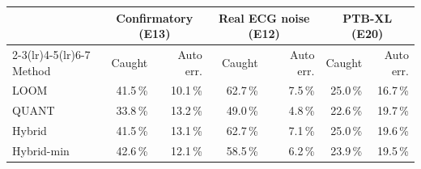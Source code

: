 \begin{tabular}{lrrrrrr}
\toprule
& \multicolumn{2}{c}{Confirmatory (E13)} & \multicolumn{2}{c}{Real ECG noise (E12)} & \multicolumn{2}{c}{PTB-XL (E20)} \\ \cmidrule(lr){2-3}\cmidrule(lr){4-5}\cmidrule(lr){6-7}
Method & Caught & Auto err. & Caught & Auto err. & Caught & Auto err. \\
\midrule
LOOM & 41.5\,\% & 10.1\,\% & 62.7\,\% & 7.5\,\% & 25.0\,\% & 16.7\,\% \\
QUANT & 33.8\,\% & 13.2\,\% & 49.0\,\% & 4.8\,\% & 22.6\,\% & 19.7\,\% \\
Hybrid & 41.5\,\% & 13.1\,\% & 62.7\,\% & 7.1\,\% & 25.0\,\% & 19.6\,\% \\
Hybrid-min & 42.6\,\% & 12.1\,\% & 58.5\,\% & 6.2\,\% & 23.9\,\% & 19.5\,\% \\
\bottomrule
\end{tabular}
